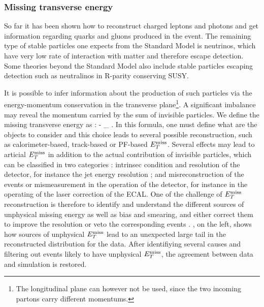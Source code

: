 
            \subsubsection{Missing transverse energy}

        So far it has been shown how to reconstruct charged leptons and photons and get
        information regarding quarks and gluons produced in the event. The remaining
        type of stable particles one expects from the Standard Model is neutrinos, which
        have very low rate of interaction with matter and therefore escape detection. Some
        theories beyond the Standard Model also include stable particles escaping detection
        such as neutralinos in R-parity conserving SUSY.

        It is possible to infer information about the production
        of such particles via the energy-momentum conservation in the transverse plane\footnote{The
        longitudinal plane can however not be used, since the two incoming partons carry
        different momentums.}. A significant imbalance may reveal the momentum carried by
        the sum of invisible particles. We define the missing transverse energy as :
        {
            \MET {} - \sum_{} \vec{\pT}.
        }
        In this formula, one must define what are the objects to consider and this choice
        leads to several possible reconstruction, such as calorimeter-based, track-based
        or PF-based $E_T^\text{miss}$. Several effects may lead to articial $E_T^\text{miss}$ in addition to the
        actual contribution of invisible particles, which can be classified in two categories :
        intrinsec condition and resolution of the detector, for instance the jet energy
        resolution ; and misreconstruction of the events or mismeasurement in the
        operation of the detector, for instance in the operating of the laser correction
        of the ECAL. One of the challenge of $E_T^\text{miss}$ reconstruction is therefore to identify
        and understand the different sources of unphysical missing energy as well as bias and
        smearing, and either correct them to improve the resolution or veto the corresponding
        events
        .
        , on the left, shows how sources of unphysical $E_T^\text{miss}$
        lead to an unexpected large tail in the reconstructed distribution for the data.
        After identifiying several causes and filtering out events likely to have unphysical
        $E_T^\text{miss}$, the agreement between data and simulation is restored.


